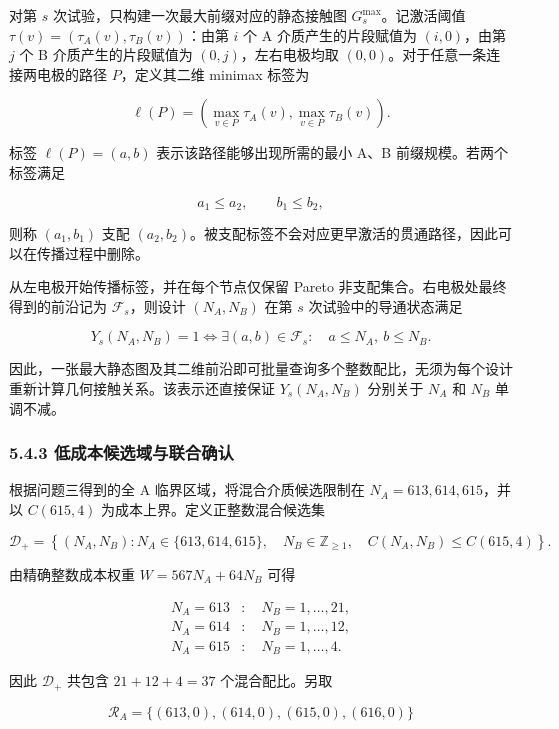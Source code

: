 对第 \(s\) 次试验，只构建一次最大前缀对应的静态接触图 \(G_s^{\max}\)。记激活阈值 \(\tau(v)=(\tau_A(v),\tau_B(v))\)：由第 \(i\) 个 A 介质产生的片段赋值为 \((i,0)\)，由第 \(j\) 个 B 介质产生的片段赋值为 \((0,j)\)，左右电极均取 \((0,0)\)。对于任意一条连接两电极的路径 \(P\)，定义其二维 minimax 标签为

\[
\ell(P)=\left(
\max_{v\in P}\tau_A(v),
\max_{v\in P}\tau_B(v)
\right).
\]

标签 \(\ell(P)=(a,b)\) 表示该路径能够出现所需的最小 A、B 前缀规模。若两个标签满足

\[
a_1\leq a_2,\qquad b_1\leq b_2,
\]

则称 \((a_1,b_1)\) 支配 \((a_2,b_2)\)。被支配标签不会对应更早激活的贯通路径，因此可以在传播过程中删除。

从左电极开始传播标签，并在每个节点仅保留 Pareto 非支配集合。右电极处最终得到的前沿记为 \(\mathcal F_s\)，则设计 \((N_A,N_B)\) 在第 \(s\) 次试验中的导通状态满足

\[
Y_s(N_A,N_B)=1
\Longleftrightarrow
\exists(a,b)\in\mathcal F_s:\quad
a\leq N_A,\ b\leq N_B.
\]

因此，一张最大静态图及其二维前沿即可批量查询多个整数配比，无须为每个设计重新计算几何接触关系。该表示还直接保证 \(Y_s(N_A,N_B)\) 分别关于 \(N_A\) 和 \(N_B\) 单调不减。

\subsubsection{5.4.3 低成本候选域与联合确认}\label{ux4f4eux6210ux672cux5bb6ux65cfux51bbux7ed3ux4e0eux72ecux7acbux786eux8ba4}

根据问题三得到的全 A 临界区域，将混合介质候选限制在 \(N_A=613,614,615\)，并以 \(C(615,4)\) 为成本上界。定义正整数混合候选集

\[
\mathcal D_+=\left\{
(N_A,N_B):
N_A\in\{613,614,615\},\quad
N_B\in\mathbb Z_{\geq1},\quad
C(N_A,N_B)\leq C(615,4)
\right\}.
\]

由精确整数成本权重 \(W=567N_A+64N_B\) 可得

\[
\begin{aligned}
N_A=613 &: \quad N_B=1,\ldots,21,\\
N_A=614 &: \quad N_B=1,\ldots,12,\\
N_A=615 &: \quad N_B=1,\ldots,4.
\end{aligned}
\]

因此 \(\mathcal D_+\) 共包含 \(21+12+4=37\) 个混合配比。另取

\[
\mathcal R_A=\{(613,0),(614,0),(615,0),(616,0)\}
\]


